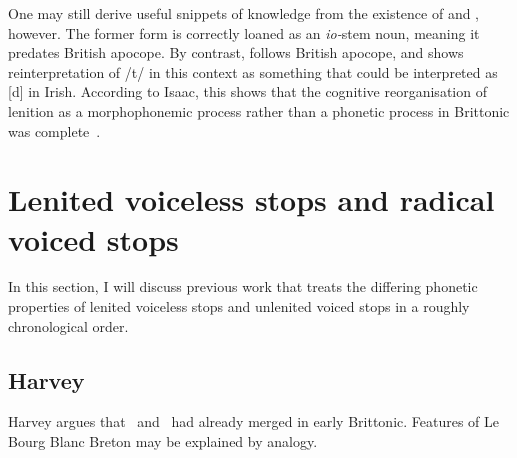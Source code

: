 One may still derive useful snippets of knowledge from the existence of  and , however. The former form is correctly loaned as an \textit{io-}stem noun, meaning it predates British apocope. By contrast,  follows British apocope, and shows reinterpretation of /t/ in this context as something that could be interpreted as [d] in Irish. According to Isaac, this shows that the cognitive reorganisation of lenition as a morphophonemic process rather than a phonetic process in Brittonic was complete~\autocite[73]{isaac_chronology_2004}. 







\section{Lenited voiceless stops and radical voiced stops}
In this section, I will discuss previous work that treats the differing phonetic properties of lenited voiceless stops and unlenited voiced stops in a roughly chronological order.

\subsection{Harvey}
\label{harveylenition}
Harvey argues that \xD\ and \lT\ had already merged in early Brittonic. Features of Le Bourg Blanc Breton may be explained by analogy.

